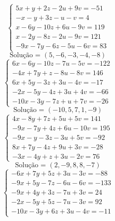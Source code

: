 \documentclass[12pt,oneside,a4paper,fleqn]{article}
\begin{document}
\begin{multicols*}{2}
\begin{equation*}
\begin{cases}
5x+y+2z-2u+9v=-51 \\
-x-y+3z-u-v=4 \\
x-6y-10z+6u-9v=119 \\
x-2y-8z-2u-9v=121 \\
-9x-7y-6z-5u-6v=83
\end{cases}
\end{equation*}
\begin{equation*}
\text{Solução = }\left(5,-6,-3,-4,-8\right)
\end{equation*}
\vspace{\baselineskip}
\begin{equation*}
\begin{cases}
6x-6y-10z-7u-5v=-122 \\
-4x+7y+z-8u-8v=146 \\
6x+5y-3z+3u-4v=-17 \\
-2x-5y-4z+3u+4v=-66 \\
-10x-3y-7z+u+7v=-26
\end{cases}
\end{equation*}
\begin{equation*}
\text{Solução = }\left(-10,5,7,1,-9\right)
\end{equation*}
\vspace{\baselineskip}
\begin{equation*}
\begin{cases}
4x-8y+7z+5u+5v=141 \\
-9x-7y+4z+6u-10v=195 \\
-9x-y-3z-3u+5v=-92 \\
8x+7y-4z+9u+3v=-28 \\
-3x-4y+z+3u-2v=76
\end{cases}
\end{equation*}
\begin{equation*}
\text{Solução = }\left(2,-9,8,8,-7\right)
\end{equation*}
\vspace{\baselineskip}
\begin{equation*}
\begin{cases}
-6x+7y+5z+3u-3v=-88 \\
-9x+5y-7z-6u-6v=-133 \\
-9x+4y+3z-7u+3v=24 \\
-2x-5y+5z-7u-3v=92 \\
-10x-3y+6z+3u-4v=-11
\end{cases}

\end{equation*}
\end{multicols*}
\end{document}
